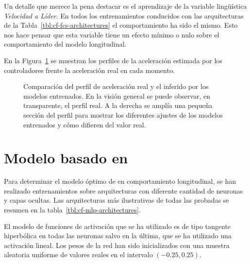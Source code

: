 Un detalle que merece la pena destacar es el aprendizaje de la variable lingüística \textit{Velocidad a Líder}. En todos los entrenamientos conducidos con las arquitecturas de la Tabla~\ref{tbl:cf-fcs-architectures} el comportamiento ha sido el mismo. Esto nos hace pensar que esta variable tiene un efecto mínimo o nulo sobre el comportamiento del modelo longitudinal.

En la Figura~\ref{fig:fcs-test-comparisons} se muestran los perfiles de la aceleración estimada por los controladores frente la aceleración real en cada momento. 

\begin{figure}[t]
	\centering
	\qquad
	\caption[Comparación del perfil de aceleración real y el inferido por los modelos entrenados]{Comparación del perfil de aceleración real y el inferido por los modelos entrenados. En la visión general se puede observar, en transparente, el perfil real. A la derecha se amplía una pequeña sección del perfil para mostrar los diferentes ajustes de los modelos entrenados y cómo difieren del valor real.}
	\label{fig:fcs-test-comparisons}
\end{figure}

\section{Modelo basado en }

Para determinar el modelo óptimo de  en comportamiento longitudinal, se han realizado entrenamientos sobre arquitecturas con diferente cantidad de neuronas y capas ocultas. Las arquitecturas más ilustrativas de todas las probadas se resumen en la tabla~\ref{tbl:cf-mlp-architectures}.

El modelo de funciones de activación que se ha utilizado es de tipo tangente hiperbólica en todas las neuronas salvo en la última, que se ha utilizado una activación lineal. Los pesos de la red han sido inicializados con una muestra aleatoria uniforme de valores reales en el intervalo $(-0.25, 0.25)$.

